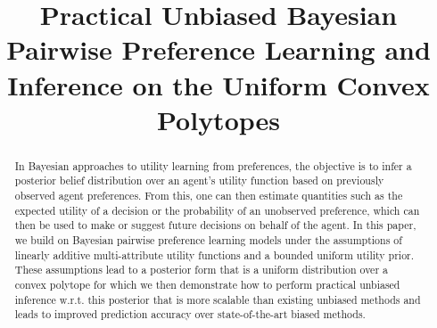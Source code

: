 \documentclass[letterpaper]{article}
\title{Practical Unbiased Bayesian Pairwise Preference Learning and Inference on the Uniform Convex Polytopes}
\author{
}
\begin{document}
\maketitle





\begin{abstract}
In Bayesian approaches to utility learning from preferences, the objective is to infer a posterior belief distribution over an agent’s utility function based on previously observed agent preferences. From this, one can then estimate quantities such as the expected utility of a decision or the probability of an unobserved preference, which can then be used to make or suggest future decisions on behalf of the agent.  In this paper, we build on Bayesian pairwise preference learning models under the assumptions of linearly additive multi-attribute utility functions and a bounded uniform utility prior. These assumptions lead to a posterior form that is a uniform distribution over a convex polytope for which we then demonstrate how to perform practical unbiased inference w.r.t. this posterior that is more scalable than existing unbiased methods and leads to improved prediction accuracy over state-of-the-art biased methods.

\end{abstract}
\end{document}
